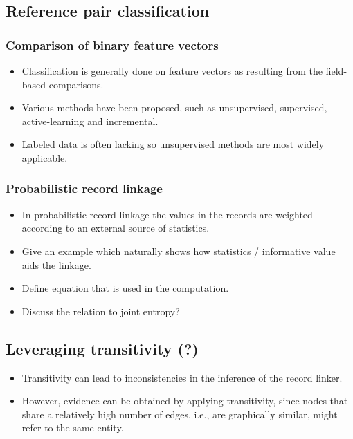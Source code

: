 \documentclass[paper=a4, fontsize=11pt]{scrartcl}
\begin{document}
\subsection{Reference pair classification}

\subsubsection{Comparison of binary feature vectors}
\begin{itemize}
    \item Classification is generally done on feature vectors as resulting from the field-based comparisons.
    \item Various methods have been proposed, such as unsupervised, supervised, active-learning and incremental.
    \item Labeled data is often lacking so unsupervised methods are most widely applicable.
\end{itemize}

\subsubsection{Probabilistic record linkage}
\begin{itemize}
    \item In probabilistic record linkage the values in the records are weighted according to an external source of statistics.
    \item Give an example which naturally shows how statistics / informative value aids the linkage.
    \item Define equation that is used in the computation.
    \item Discuss the relation to joint entropy?
\end{itemize}

\subsection{Leveraging transitivity (?)}
\begin{itemize}
    \item Transitivity can lead to inconsistencies in the inference of the record linker.
    \item However, evidence can be obtained by applying transitivity, since nodes that share a relatively high number of edges, i.e., are graphically similar, might refer to the same entity.
\end{itemize}
\end{document}
